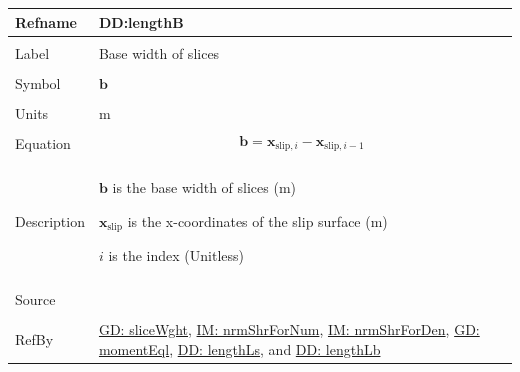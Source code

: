 \documentclass[12pt]{article}
\begin{document}
\vspace{\baselineskip}
\noindent
\begin{minipage}{\textwidth}
\begin{tabular}{>{\raggedright}p{}>{\raggedright\arraybackslash}p{}}
\toprule \textbf{Refname} & \textbf{DD:lengthB}
\label{DD:lengthB}
\\ \midrule \\
Label & Base width of slices
        
\\ \midrule \\
Symbol & $\mathbf{b}$
         
\\ \midrule \\
Units & m
        
\\ \midrule \\
Equation & \begin{displaymath}
           \mathbf{b}={\mathbf{x}_{\text{slip},i}}-{\mathbf{x}_{\text{slip},i-1}}
           \end{displaymath}
\\ \midrule \\
Description & \begin{symbDescription}
              \item{$\mathbf{b}$ is the base width of slices (m)}
              \item{${\mathbf{x}_{\text{slip}}}$ is the x-coordinates of the slip surface (m)}
              \item{$i$ is the index (Unitless)}
              \end{symbDescription}
\\ \midrule \\
Source & \cite{fredlund1977}
         
\\ \midrule \\
RefBy & \hyperref[GD:sliceWght]{GD: sliceWght}, \hyperref[IM:nrmShrForNum]{IM: nrmShrForNum}, \hyperref[IM:nrmShrForDen]{IM: nrmShrForDen}, \hyperref[GD:momentEql]{GD: momentEql}, \hyperref[DD:lengthLs]{DD: lengthLs}, and \hyperref[DD:lengthLb]{DD: lengthLb}
        
\\ \bottomrule
\end{tabular}
\end{minipage}
\end{document}
